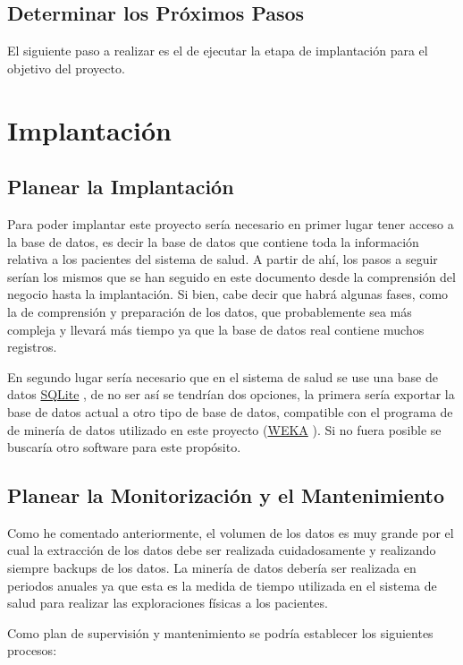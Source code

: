 \documentclass{article}
\begin{document}
\subsection{Determinar los Próximos Pasos}
El siguiente paso a realizar es el de ejecutar la etapa de implantación para el objetivo del proyecto.

\section{Implantación}
\subsection{Planear la Implantación}
Para poder implantar este proyecto sería necesario en primer lugar tener acceso a la base de datos, es decir la base de datos que contiene toda la información relativa a los pacientes del sistema de salud. A partir de ahí, los pasos a seguir serían los mismos que se han seguido en este documento desde la comprensión del negocio hasta la implantación. Si bien, cabe decir que habrá algunas fases, como la de comprensión y preparación de los datos, que probablemente sea más compleja y llevará más tiempo ya que la base de datos real contiene muchos registros.

En segundo lugar sería necesario que en el sistema de salud se use una base de datos \href{https://www.sqlite.org/copyright.html}{SQLite} , de no ser así se tendrían dos opciones, la primera sería exportar la base de datos actual a otro tipo de base de datos, compatible con el programa de de minería de datos utilizado en este proyecto (\href{https://www.cs.waikato.ac.nz/~ml/weka/}{WEKA} ). Si no fuera posible se buscaría otro software para este propósito.

\subsection{Planear la Monitorización y el Mantenimiento}
Como he comentado anteriormente, el volumen de los datos es muy grande por el cual la extracción de los datos debe ser realizada cuidadosamente y realizando siempre backups de los datos. La minería de datos debería ser realizada en periodos anuales ya que esta es la medida de tiempo utilizada en el sistema de salud para realizar las exploraciones físicas a los pacientes.

Como plan de supervisión y mantenimiento se podría establecer los siguientes procesos:
\end{document}
